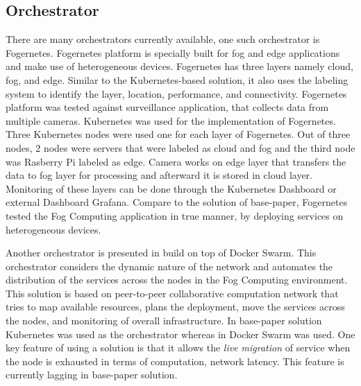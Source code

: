 \subsection{Orchestrator}
\label{sec:infra}
There are many orchestrators currently available, one such orchestrator is Fogernetes\cite{Wobker2018}. Fogernetes\cite{Wobker2018} platform is specially built for fog and edge applications and make use of heterogeneous devices. Fogernetes\cite{Wobker2018} has three layers namely cloud, fog, and edge. Similar to the Kubernetes-based solution\cite{Santos2019}, it also uses the labeling system to identify the layer, location, performance, and connectivity\cite{Wobker2018}. Fogernetes\cite{Wobker2018} platform was tested against surveillance application, that collects data from multiple cameras. Kubernetes was used for the implementation of Fogernetes\cite{Wobker2018}. Three Kubernetes nodes were used one for each layer of Fogernetes\cite{Wobker2018}. Out of three nodes, 2 nodes were servers that were labeled as cloud and fog and the third node was Rasberry Pi labeled as edge\cite{Wobker2018}. Camera works on edge layer that transfers the data to fog layer for processing and afterward it is stored in cloud layer. Monitoring of these layers can be done through the  Kubernetes Dashboard or external Dashboard Grafana. Compare to the solution of base-paper\cite{Santos2019}, Fogernetes\cite{Wobker2018} tested the Fog Computing application in true manner, by deploying services on heterogeneous devices.\par
Another orchestrator is presented in \cite{Reale} build on top of Docker Swarm. This orchestrator considers the dynamic nature of the network and automates the distribution of the services across the nodes in the Fog Computing environment\cite{Reale}. This solution is based on peer-to-peer collaborative computation network that tries to map available resources, plans the deployment, move the services across the nodes, and monitoring of overall infrastructure\cite{Reale}. In base-paper solution\cite{Santos2019} Kubernetes was used as the orchestrator whereas in \cite{Reale} Docker Swarm was used. One key feature of using a solution\cite{Reale} is that it allows the \emph{live migration} of service when the node is exhausted in terms of computation, network latency. This feature is currently lagging in base-paper solution\cite{Santos2019}.
